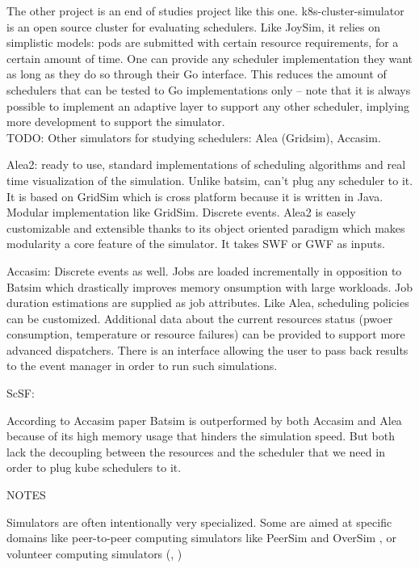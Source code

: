 The other project is an end of studies project like this one.
k8s-cluster-simulator\cite{k8s-cluster-simulator} is an open source cluster for
evaluating schedulers. Like JoySim, it relies on simplistic models: pods are
submitted with certain resource requirements, for a certain amount of time. One
can provide any scheduler implementation they want as long as they do so
through their Go interface. This reduces the amount of schedulers that can be
tested to Go implementations only -- note that it is always possible to
implement an adaptive layer to support any other scheduler, implying more
development to support the simulator.\\

TODO: Other simulators for studying schedulers: Alea (Gridsim), Accasim.

Alea2: ready to use, standard implementations of scheduling algorithms and real
time visualization of the simulation. Unlike batsim, can't plug any scheduler
to it. It is based on GridSim which is cross platform because it is written in
Java. Modular implementation like GridSim. Discrete events. Alea2 is easely customizable and extensible thanks to its object oriented paradigm which makes modularity a core feature of the simulator. It takes SWF or GWF as inputs.

Accasim: Discrete events as well. Jobs are loaded incrementally in opposition
to Batsim which drastically improves memory onsumption with large workloads.
Job duration estimations are supplied as job attributes. Like Alea, scheduling
policies can be customized. Additional data about the current resources status (pwoer consumption, temperature or resource failures) can be provided to support more advanced dispatchers. There is an interface allowing the user to pass back results to the event manager in order to run such simulations.

ScSF:

According to Accasim paper Batsim is outperformed by both Accasim and Alea
because of its high memory usage that hinders the simulation speed. But both
lack the decoupling between the resources and the scheduler that we need in
order to plug kube schedulers to it.

NOTES

Simulators are often intentionally very specialized. Some are aimed at specific
domains like peer-to-peer computing simulators like PeerSim
\cite{p2p09-peersim} and OverSim \cite{baumgart2009oversim}, or volunteer
computing simulators (\cite{simBA}, \cite{alonso2017combos})

